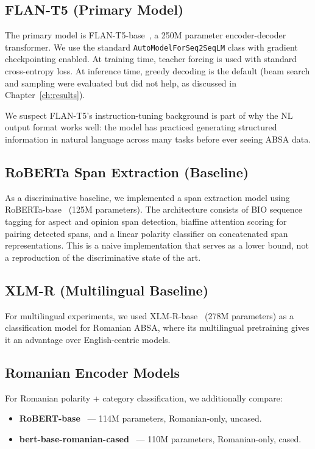 \documentclass[12pt,a4paper]{report}
\begin{document}
\subsection{FLAN-T5 (Primary Model)}

The primary model is FLAN-T5-base~\cite{chung2022scaling}, a 250M parameter encoder-decoder transformer. We use the standard \texttt{AutoModelForSeq2SeqLM} class with gradient checkpointing enabled. At training time, teacher forcing is used with standard cross-entropy loss. At inference time, greedy decoding is the default (beam search and sampling were evaluated but did not help, as discussed in Chapter~\ref{ch:results}).

We suspect FLAN-T5's instruction-tuning background is part of why the NL output format works well: the model has practiced generating structured information in natural language across many tasks before ever seeing ABSA data.

\subsection{RoBERTa Span Extraction (Baseline)}

As a discriminative baseline, we implemented a span extraction model using RoBERTa-base~\cite{liu2019roberta} (125M parameters). The architecture consists of BIO sequence tagging for aspect and opinion span detection, biaffine attention scoring for pairing detected spans, and a linear polarity classifier on concatenated span representations. This is a naive implementation that serves as a lower bound, not a reproduction of the discriminative state of the art.

\subsection{XLM-R (Multilingual Baseline)}

For multilingual experiments, we used XLM-R-base~\cite{conneau2020unsupervised} (278M parameters) as a classification model for Romanian ABSA, where its multilingual pretraining gives it an advantage over English-centric models.

\subsection{Romanian Encoder Models}

For Romanian polarity + category classification, we additionally compare:
\begin{itemize}
    \item \textbf{RoBERT-base}~\cite{masala2020robert} --- 114M parameters, Romanian-only, uncased.
    \item \textbf{bert-base-romanian-cased}~\cite{dumitrescu2020birth} --- 110M parameters, Romanian-only, cased.
\end{itemize}
\end{document}
